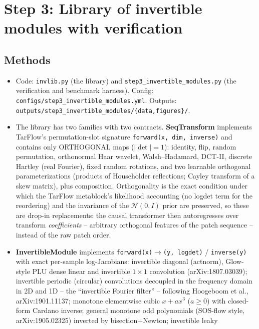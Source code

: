 \documentclass[11pt]{article}
\begin{document}
\section{Step 3: Library of invertible modules with verification}

\subsection{Methods}
\begin{itemize}
  \item Code: \texttt{invlib.py} (the library) and
        \texttt{step3\_invertible\_modules.py} (the verification and
        benchmark harness). Config:
        \texttt{configs/step3\_invertible\_modules.yml}. Outputs:
        \texttt{outputs/step3\_invertible\_modules/\{data,figures\}/}.
  \item The library has two families with two contracts.
        \textbf{SeqTransform} implements TarFlow's permutation-slot signature
        \texttt{forward(x, dim, inverse)} and contains only ORTHOGONAL maps
        ($|\det|=1$): identity, flip, random permutation, orthonormal Haar
        wavelet, Walsh--Hadamard, DCT-II, discrete Hartley (real Fourier),
        fixed random rotations, and two learnable orthogonal
        parameterizations (products of Householder reflections; Cayley
        transform of a skew matrix), plus composition. Orthogonality is the
        exact condition under which the TarFlow metablock's likelihood
        accounting (no logdet term for the reordering) and the invariance of
        the $\mathcal{N}(0,I)$ prior are preserved, so these are drop-in
        replacements: the causal transformer then autoregresses over
        transform \emph{coefficients} -- arbitrary orthogonal features of the
        patch sequence -- instead of the raw patch order.
  \item \textbf{InvertibleModule} implements
        \texttt{forward(x)$\to$(y, logdet)} / \texttt{inverse(y)} with exact
        per-sample log-Jacobians: invertible diagonal (actnorm), Glow-style
        PLU dense linear and invertible $1{\times}1$ convolution
        (arXiv:1807.03039); invertible periodic (circular) convolutions
        decoupled in the frequency domain in 2D and 1D -- the ``invertible
        Fourier filter'' -- following Hoogeboom et al., arXiv:1901.11137;
        monotone elementwise cubic $x + ax^3$ ($a\ge0$) with closed-form
        Cardano inverse; general monotone odd polynomials (SOS-flow style,
        arXiv:1905.02325) inverted by bisection+Newton; invertible leaky

\end{itemize}
\end{document}
